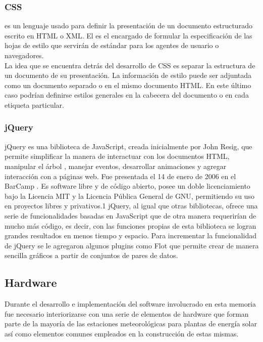 \subsubsection{CSS}
 es un lenguaje usado para definir la presentación de un documento estructurado escrito en HTML o XML. El  es el encargado de formular la especificación de las hojas de estilo que servirán de estándar para los agentes de usuario o navegadores.\\
La idea que se encuentra detrás del desarrollo de CSS es separar la estructura de un documento de su presentación. La información de estilo puede ser adjuntada como un documento separado o en el mismo documento HTML. En este último caso podrían definirse estilos generales en la cabecera del documento o en cada etiqueta particular.

\subsubsection{jQuery}
jQuery\cite{software:jquery} es una biblioteca de JavaScript, creada inicialmente por John Resig, que permite simplificar la manera de interactuar con los documentos HTML, manipular el árbol , manejar eventos, desarrollar animaciones y agregar interacción con  a páginas web. Fue presentada el 14 de enero de 2006 en el BarCamp . Es software libre y de código abierto, posee un doble licenciamiento bajo la Licencia MIT\cite{licencia:mit} y la Licencia Pública General de GNU\cite{licencia:gnu}, permitiendo su uso en proyectos libres y privativos.1 jQuery, al igual que otras bibliotecas, ofrece una serie de funcionalidades basadas en JavaScript que de otra manera requerirían de mucho más código, es decir, con las funciones propias de esta biblioteca se logran grandes resultados en menos tiempo y espacio.
Para incrementar la funcionalidad de jQuery se le agregaron algunos plugins como Flot\cite{software:flot} que permite crear de manera sencilla gráficos a partir de conjuntos de pares de datos.

\subsection{Hardware}
Durante el desarrollo e implementación del software involucrado en esta memoria fue necesario interiorizarse con una serie de elementos de hardware que forman parte de la mayoría de las estaciones meteorológicas para plantas de energía solar así como elementos comunes empleados en la construcción de estas mismas.\\

